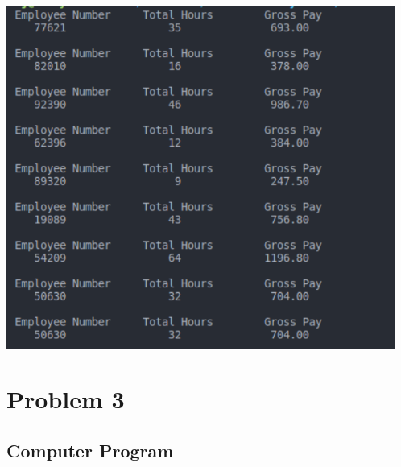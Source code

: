 			\includegraphics[width=12.75cm]{gross-pay.png}


\section{{Problem 3}}
	
	\subsection{{Computer Program}}
	

